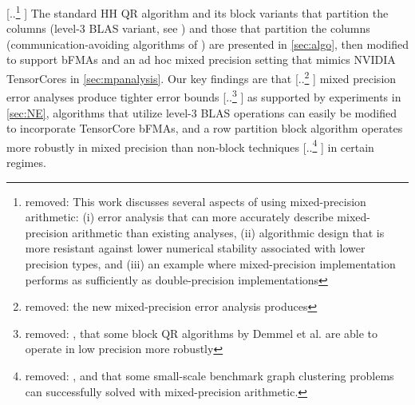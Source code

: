 \documentclass[review,onefignum,onetabnum]{siamart190516}
\providecommand{\DIFadd}[1]{{\protect\color{blue} \sf #1}} %
\providecommand{\DIFdel}[1]{{\protect\color{red} [..\footnote{removed: #1} ]}} %
\providecommand{\DIFaddbegin}{} %
\providecommand{\DIFaddend}{} %
\providecommand{\DIFdelbegin}{} %
\providecommand{\DIFdelend}{} %
\begin{document}
\DIFdel{This work discusses several aspects of using mixed-precision arithmetic: (i) error analysis that can more accurately describe mixed-precision arithmetic than existing analyses, (ii) algorithmic design that is more resistant against lower numerical stability associated with lower precision types, and (iii) an example where mixed-precision implementation performs as sufficiently as double-precision implementations}\DIFdelend %
\DIFaddbegin \DIFadd{The standard HH QR algorithm and its block variants that partition the columns (level-3 BLAS variant, see \cite{golub2013matrix,Higham2002}) and those that partition the columns (communication-avoiding algorithms of \cite{Demmel2012}) are presented in \cref{sec:algo}, then modified to support bFMAs and an ad hoc mixed precision setting that mimics NVIDIA TensorCores in \cref{sec:mpanalysis}}\DIFaddend .
Our key findings are that \DIFdelbegin \DIFdel{the new mixed-precision error analysis produces }\DIFdelend \DIFaddbegin \DIFadd{mixed precision error analyses produce }\DIFaddend tighter error bounds \DIFdelbegin \DIFdel{, that some block QR algorithms by Demmel et al. \cite{Demmel2012} are able to operate in low precision more robustly }\DIFdelend \DIFaddbegin \DIFadd{as supported by experiments in \cref{sec:NE}, algorithms that utilize level-3 BLAS operations can easily be modified to incorporate TensorCore bFMAs, and a row partition block algorithm operates  more robustly in mixed precision }\DIFaddend than non-block techniques \DIFdelbegin \DIFdel{, and that some small-scale benchmark graph clustering problems can successfully solved with mixed-precision arithmetic.
}\DIFdelend \DIFaddbegin \DIFadd{in certain regimes.
}\DIFaddend 
\end{document}
